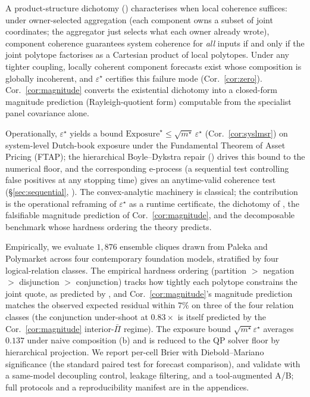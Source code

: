 \documentclass{article}
\theoremstyle{plain}
\theoremstyle{definition}
\theoremstyle{remark}
\newcommand{\eps}{\varepsilon}
\begin{document}
A product-structure dichotomy () characterises
when local coherence suffices: under owner-selected aggregation
(each component owns a subset of joint coordinates; the aggregator
just selects what each owner already wrote), component coherence
guarantees system coherence for \emph{all} inputs if and only if
the joint polytope factorises as a Cartesian product of local
polytopes. Under any tighter coupling, locally coherent component
forecasts exist whose composition is globally incoherent, and
$\eps^\star$ certifies this failure mode (Cor.~\ref{cor:zero}).
Cor.~\ref{cor:magnitude} converts the existential dichotomy into a
closed-form magnitude prediction (Rayleigh-quotient form) computable
from the specialist panel covariance alone.

Operationally, $\eps^\star$ yields a bound
$\mathrm{Exposure}^\star\!\le\!\sqrt{m^\star}\,\eps^\star$
(Cor.~\ref{cor:syslmsr}) on system-level Dutch-book exposure under
the Fundamental Theorem of Asset Pricing (FTAP); the hierarchical
Boyle--Dykstra repair () drives this bound to the
numerical floor, and the corresponding e-process (a sequential test
controlling false positives at any stopping time) gives an
anytime-valid coherence test (\S\ref{sec:sequential}, ).
The convex-analytic machinery is classical; the contribution is
the operational reframing of $\eps^\star$ as a runtime certificate,
the dichotomy of , the falsifiable magnitude
prediction of Cor.~\ref{cor:magnitude}, and the decomposable
benchmark whose hardness ordering the theory predicts.

Empirically, we evaluate $1{,}876$ ensemble cliques drawn from Paleka
\citep{paleka2024consistency} and Polymarket across four contemporary
foundation models, stratified by four logical-relation classes. The
empirical hardness ordering (partition $>$ negation $>$ disjunction
$>$ conjunction) tracks how tightly each polytope constrains the
joint quote, as predicted by , and Cor.~\ref{cor:magnitude}'s
magnitude prediction matches the observed expected residual
within $7\%$ on three of the four relation classes (the
conjunction under-shoot at $0.83\!\times$ is itself predicted by
the Cor.~\ref{cor:magnitude} interior-$\bar\Pi$ regime). The
exposure bound
$\sqrt{m^\star}\eps^\star$ averages $0.137$ under naive composition
(b) and is reduced to the QP solver floor by
hierarchical projection. We report per-cell Brier with
Diebold--Mariano significance (the standard paired test for forecast
comparison), and validate with a same-model decoupling control,
leakage filtering, and a tool-augmented A/B; full protocols and a
reproducibility manifest are in the appendices.
\end{document}
